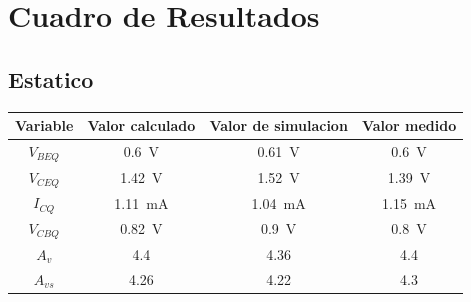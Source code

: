 \documentclass[a4paper,12pt]{article}
\newcommand{\mI}[1]{\SI{#1}{\milli\ampere}}
\newcommand{\mV}[1]{\SI{#1}{\volt}}
\begin{document}
\newpage
\section{Cuadro de Resultados}

\subsection{Estatico}
\begin{table}[h]
    \centering
    \begin{tabular}{|c|c|c|c|}
        \hline
        Variable & Valor calculado      & Valor de simulacion & Valor medido      \\ \hline
        $V_{BEQ}$     & \mV{0.6}        & \mV{0.61}           & \mV{0.6}          \\ \hline
        $V_{CEQ}$     & \mV{1.42}       & \mV{1.52}           & \mV{1.39}         \\ \hline
        $I_{CQ}$      & \mI{1.11}       & \mI{1.04}           & \mI{1.15}         \\ \hline
        $V_{CBQ}$     & \mV{0.82}       & \mV{0.9}            & \mV{0.8}          \\ \hline
        $A_v$         & 4.4             & 4.36                & 4.4               \\ \hline
        $A_{vs}$      & 4.26            & 4.22                & 4.3               \\ \hline
    \end{tabular}
\end{table}
\end{document}
